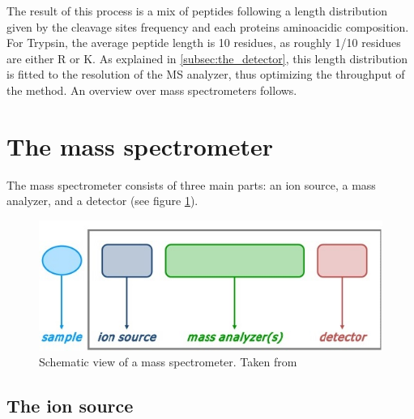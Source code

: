 \documentclass[11pt, a4paper]{report}
\begin{document}
The result of this process is a mix of peptides following a length distribution given by the cleavage sites frequency and each protein\textquotesingle s aminoacidic composition. For Trypsin, the average peptide length is 10 residues, as roughly 1/10 residues are either R or K.
As explained in \ref{subsec:the_detector}, this length distribution is fitted to the resolution of the MS analyzer, thus optimizing the throughput of the method. An overview over mass spectrometers follows.

\section{The mass spectrometer}
\label{sec:the_mass_spectrometer}

The mass spectrometer consists of three main parts: an ion source, a mass analyzer, and a detector (see figure \ref{fig:mass_spectrometer}).

\begin{figure}[!h]
\includegraphics[width=\textwidth]{mass_spectrometer}
\caption[]{Schematic view of a mass spectrometer. Taken from \footnotemark}
\label{fig:mass_spectrometer}
\end{figure}


\subsection{The ion source}
\label{subsec:the_ion_source}
\end{document}
